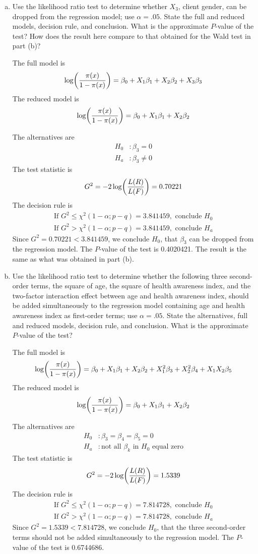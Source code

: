\documentclass[10pt]{report}
\DeclarePairedDelimiter\autoparen{(}{)}
\newcommand{\pa}[1]{\autoparen*{#1}}
\begin{document}
\begin{enumerate}[a.]
	\item 
	Use the likelihood ratio test to determine whether $X_3$, client gender, can be dropped from the regression model; use $\alpha=.05$. State the full and reduced models, decision rule, and conclusion. What is the approximate $P$-value of the test? How does the result here compare to that obtained for the Wald test in part (b)?
	
	The full model is
	\[
	\log\pa{\frac{\pi(x)}{1-\pi(x)}} = \beta_0 + X_1 \beta_1 + X_2 \beta_2 + X_3 \beta_3 
	\]
	The reduced model is
	\[
	\log\pa{\frac{\pi(x)}{1-\pi(x)}} = \beta_0 + X_1 \beta_1 + X_2 \beta_2
	\]
	
	The alternatives are
	\begin{align*}
		H_0 &: \beta_3 = 0\\
		H_a &: \beta_3 \ne 0
	\end{align*}
	The test statistic is
	\[
	G^2 = -2 \log\pa{\frac{L(R)}{L(F)}} =  0.70221
	\]
	The decision rule is
	\begin{align*}
		\text{If } G^2 \le \chi^2(1-\alpha; p-q) = 3.841459, \text{ conclude } H_0\\
		\text{If } G^2 > \chi^2(1-\alpha; p-q) = 3.841459, \text{ conclude } H_a
	\end{align*}
	Since $G^2 = 0.70221 < 3.841459$, we conclude $H_0$, that $\beta_3$ can be dropped from the regression model. The $P$-value of the test is 0.4020421. The result is the same as what was obtained in part (b).
	
	\item 
	Use the likelihood ratio test to determine whether the following three second-order terms, the square of age, the square of health awareness index, and the two-factor interaction effect between age and health awareness index, should be added simultaneously to the regression model containing age and health awareness index as first-order terms; use $\alpha=.05$. State the alternatives, full and reduced models, decision rule, and conclusion. What is the approximate $P$-value of the test?
	
	The full model is
	\[
	\log\pa{\frac{\pi(x)}{1-\pi(x)}} = \beta_0 + X_1 \beta_1 + X_2 \beta_2 + X_1^2 \beta_3 + X_2^2 \beta_4 + X_1 X_2 \beta_5
	\]
	The reduced model is
	\[
	\log\pa{\frac{\pi(x)}{1-\pi(x)}} = \beta_0 + X_1 \beta_1 + X_2 \beta_2
	\]
	
	The alternatives are
	\begin{align*}
	H_0 &: \beta_3 = \beta_4 = \beta_5 = 0\\
	H_a &: \text{not all $\beta_k$ in $H_0$ equal zero}
	\end{align*}
	The test statistic is
	\[
	G^2 = -2 \log\pa{\frac{L(R)}{L(F)}} =  1.5339
	\]
	The decision rule is
	\begin{align*}
	\text{If } G^2 \le \chi^2(1-\alpha; p-q) = 7.814728, \text{ conclude } H_0\\
	\text{If } G^2 > \chi^2(1-\alpha; p-q) = 7.814728, \text{ conclude } H_a
	\end{align*}
	Since $G^2 = 1.5339 < 7.814728$, we conclude $H_0$, that the three second-order terms should not be added simultaneously to the regression model. The $P$-value of the test is 0.6744686. 
\end{enumerate}
\end{document}
